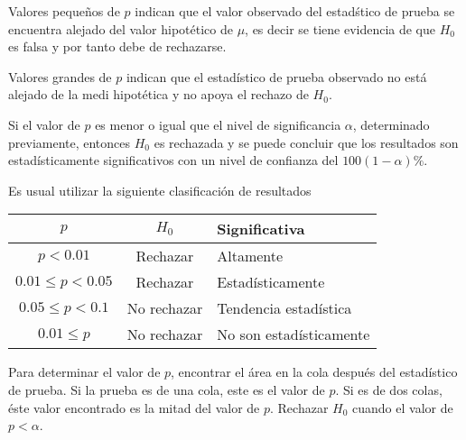 \begin{frame}
\begin{frame}
\begin{Note}
Valores peque\~ nos de $p$ indican 	que el valor observado del estad\'stico de prueba se encuentra alejado del valor hipot\'etico de $\mu$, es decir se tiene evidencia de que $H_{0}$ es falsa y por tanto debe de rechazarse.
\end{Note}









\begin{Note}
Valores grandes de $p$ indican que el estad\'istico de prueba observado no est\'a alejado de la medi hipot\'etica y no apoya el rechazo de $H_{0}$.
\end{Note}

\begin{Def}
Si el valor de $p$ es menor o igual que el nivel de significancia $\alpha$, determinado previamente, entonces $H_{0}$ es rechazada y se puede concluir que los resultados son estad\'isticamente significativos con un nivel de confianza del $100\left(1-\alpha\right)\%$.
\end{Def}
Es usual utilizar la siguiente clasificaci\'on de resultados









\begin{tabular}{|c||c|l|}\hline
$p$& $H_{0}$&Significativa\\\hline\hline
$p<0.01$&Rechazar &Altamente\\\hline
$0.01\leq p<0.05$ & Rechazar&Estad\'isticamente\\\hline
$0.05\leq p <0.1$ & No rechazar & Tendencia estad\'istica\\\hline
$0.01\leq p$ & No rechazar & No son estad\'isticamente\\\hline
\end{tabular}

\begin{Note}
Para determinar el valor de $p$, encontrar el \'area en la cola despu\'es del estad\'istico de prueba. Si la prueba es de una cola, este es el valor de $p$. Si es de dos colas, \'este valor encontrado es la mitad del valor de $p$. Rechazar $H_{0}$ cuando el valor de $p<\alpha$.
\end{Note}









\end{frame}
\end{frame}
